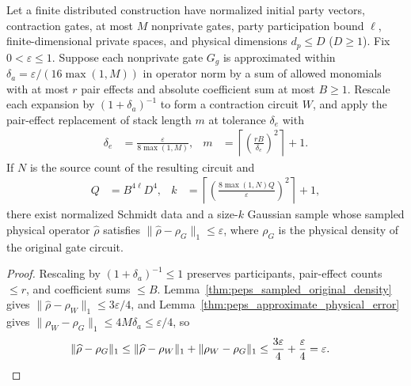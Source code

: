 \begin{lemma}
    \label{thm:peps_approximate_source_sample}
    \leanok
    Let a finite distributed construction have normalized initial party vectors,
    contraction gates, at most $M$ nonprivate gates, party participation bound
    $\ell$, finite-dimensional private spaces, and physical dimensions $d_p\le D$
    ($D\ge1$).
    Fix $0<\varepsilon\le1$. Suppose each nonprivate gate $G_g$ is approximated
    within $\delta_a=\varepsilon/(16\max(1,M))$ in operator norm by a sum of
    allowed monomials with at most $r$ pair effects and absolute coefficient sum
    at most $B\ge1$. Rescale each expansion by $(1+\delta_a)^{-1}$ to form a
    contraction circuit $W$, and apply the pair-effect replacement of stack
    length $m$ at tolerance $\delta_e$ with
    \begin{align}
        \delta_e & =\frac{\varepsilon}{8\max(1,M)},                              &
        m        & =\left\lceil\left(\frac{rB}{\delta_e}\right)^2\right\rceil+1.
        \label{eq:peps_approximate_effect_params}
    \end{align}
    If $N$ is the source count of the resulting circuit and
    \begin{align}
        Q & =B^{4\ell}D^4,                                                            &
        k & =\left\lceil\left(\frac{8\max(1,N)Q}{\varepsilon}\right)^2\right\rceil+1,
        \label{eq:peps_approximate_sample_params}
    \end{align}
    there exist normalized Schmidt data and a size-$k$ Gaussian sample whose
    sampled physical operator $\widehat\rho$ satisfies
    $\|\widehat\rho-\rho_G\|_1\le\varepsilon$, where $\rho_G$ is the physical
    density of the original gate circuit.
\end{lemma}
\begin{proof}
    \leanok
    Rescaling by $(1+\delta_a)^{-1}\le 1$
    preserves participants, pair-effect counts $\le r$, and coefficient sums
    $\le B$. Lemma~\ref{thm:peps_sampled_original_density} gives
    $\|\widehat\rho-\rho_W\|_1\le3\varepsilon/4$, and
    Lemma~\ref{thm:peps_approximate_physical_error} gives
    $\|\rho_W-\rho_G\|_1\le4M\delta_a\le\varepsilon/4$, so
    \begin{align}
        \|\widehat\rho-\rho_G\|_1
         & \le\|\widehat\rho-\rho_W\|_1+\|\rho_W-\rho_G\|_1
        \le\frac{3\varepsilon}{4}+\frac{\varepsilon}{4}=\varepsilon.\notag
    \end{align}
\end{proof}


